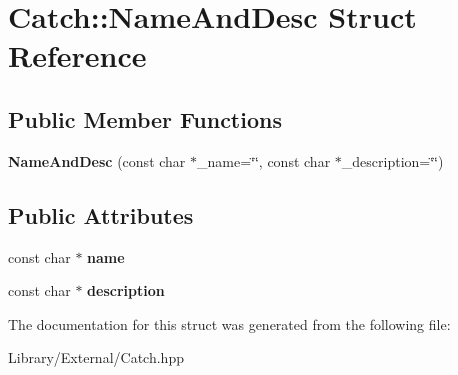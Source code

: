 \hypertarget{struct_catch_1_1_name_and_desc}{}\section{Catch\+:\+:Name\+And\+Desc Struct Reference}
\label{struct_catch_1_1_name_and_desc}
\subsection*{Public Member Functions}
\begin{DoxyCompactItemize}
\item 
\hypertarget{struct_catch_1_1_name_and_desc_a189ceb9942fb5f6635140d6a09fc843a}{}{\bfseries Name\+And\+Desc} (const char $\ast$\+\_\+name=\char`\"{}\char`\"{}, const char $\ast$\+\_\+description=\char`\"{}\char`\"{})\label{struct_catch_1_1_name_and_desc_a189ceb9942fb5f6635140d6a09fc843a}

\end{DoxyCompactItemize}
\subsection*{Public Attributes}
\begin{DoxyCompactItemize}
\item 
\hypertarget{struct_catch_1_1_name_and_desc_a374b4ed8be3cf98be20ebde5273bde51}{}const char $\ast$ {\bfseries name}\label{struct_catch_1_1_name_and_desc_a374b4ed8be3cf98be20ebde5273bde51}

\item 
\hypertarget{struct_catch_1_1_name_and_desc_a3463a23ff65ce494fc380452b57b7970}{}const char $\ast$ {\bfseries description}\label{struct_catch_1_1_name_and_desc_a3463a23ff65ce494fc380452b57b7970}

\end{DoxyCompactItemize}


The documentation for this struct was generated from the following file\+:\begin{DoxyCompactItemize}
\item 
Library/\+External/Catch.\+hpp\end{DoxyCompactItemize}
